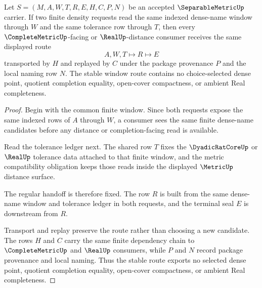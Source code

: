\begin{theorem}
\label{thm:separable-metric-dense-window-stability}
Let $S=(M,A,W,T,R,E,H,C,P,N)$ be an accepted $\SeparableMetricUp$ carrier. If two finite density requests read the same indexed dense-name window through $W$ and the same tolerance row through $T$, then every $\CompleteMetricUp$-facing or $\RealUp$-distance consumer receives the same displayed route
$$
A,W,T\longmapsto R\longmapsto E
$$
transported by $H$ and replayed by $C$ under the package provenance $P$ and the local naming row $N$. The stable window route contains no choice-selected dense point, quotient completion equality, open-cover compactness, or ambient Real completeness.
\end{theorem}
\begin{proof}
Begin with the common finite window. Since both requests expose the same indexed rows of $A$ through $W$, a consumer sees the same finite dense-name candidates before any distance or completion-facing read is available.

Read the tolerance ledger next. The shared row $T$ fixes the $\DyadicRatCoreUp$ or $\RealUp$ tolerance data attached to that finite window, and the metric compatibility obligation keeps those reads inside the displayed $\MetricUp$ distance surface.

The regular handoff is therefore fixed. The row $R$ is built from the same dense-name window and tolerance ledger in both requests, and the terminal seal $E$ is downstream from $R$.

Transport and replay preserve the route rather than choosing a new candidate. The rows $H$ and $C$ carry the same finite dependency chain to $\CompleteMetricUp$ and $\RealUp$ consumers, while $P$ and $N$ record package provenance and local naming. Thus the stable route exports no selected dense point, quotient completion equality, open-cover compactness, or ambient Real completeness.
\end{proof}

